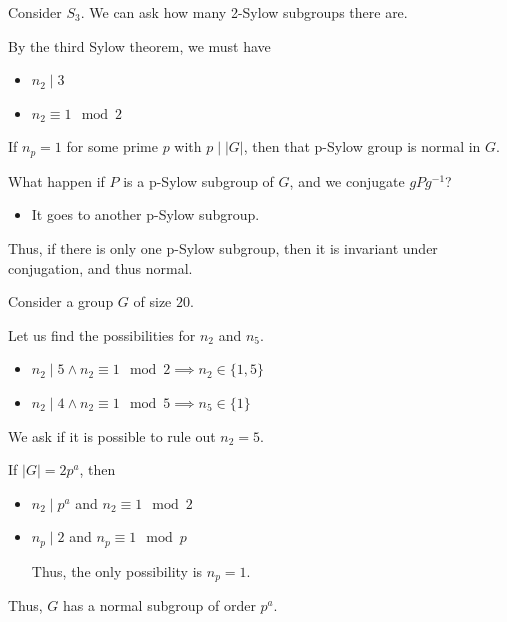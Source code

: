 \begin{remark}
    Consider $S_3$. We can ask how many 2-Sylow subgroups there are.

    By the third Sylow theorem, we must have
    \begin{itemize}
        \item $n_2 \mid 3$
        \item $n_2 \equiv 1 \mod 2$
    \end{itemize}
\end{remark}

\begin{proposition}
    If $n_p = 1$ for some prime $p$ with $p \mid |G|$, then that p-Sylow group is normal in $G$.
\end{proposition}

What happen if $P$ is a p-Sylow subgroup of $G$, and we conjugate $gPg^{-1}$?

\begin{itemize}
    \item It goes to another p-Sylow subgroup.
\end{itemize}

Thus, if there is only one p-Sylow subgroup, then it is invariant under conjugation, and thus normal.

\begin{example}
    Consider a group $G$ of size $20$. 

    Let us find the possibilities for $n_2$ and $n_5$. 

    \begin{itemize}
        \item $n_2 \mid 5 \land n_2 \equiv 1 \mod 2 \implies n_2 \in \{ 1, 5 \}$
        \item $n_2 \mid 4 \land n_2 \equiv 1 \mod 5 \implies n_5 \in \{ 1 \}$
    \end{itemize}

    We ask if it is possible to rule out $n_2 = 5$.
\end{example}

\begin{example}
    If $|G| = 2p^a$, then 
    \begin{itemize}
        \item $n_2 \mid p^a$ and $n_2 \equiv 1 \mod 2$
        \item $n_p \mid 2$ and $n_p \equiv 1 \mod p$
        
        Thus, the only possibility is $n_p = 1$. 
    \end{itemize}

    Thus, $G$ has a normal subgroup of order $p^a$.
\end{example}

